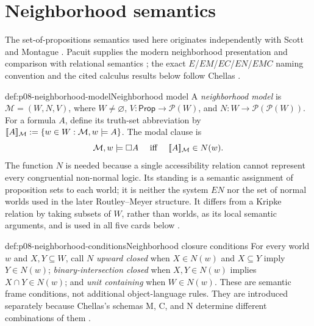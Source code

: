 \section{Neighborhood semantics}

The set-of-propositions semantics used here originates independently with
Scott and Montague \cite{Scott1970,Montague1970}.  Pacuit supplies the modern
neighborhood presentation and comparison with relational semantics
\cite{Pacuit2017}; the exact \(E\)/\(EM\)/\(EC\)/\(EN\)/\(EMC\) naming
convention and the cited
calculus results below follow Chellas \cite{Chellas1980}.

\begin{hbdefinition}{def:p08-neighborhood-model}{Neighborhood model}
A \emph{neighborhood model} is
\(\mathcal M=(W,N,V)\), where \(W\ne\varnothing\),
\(V:\mathsf{Prop}\to\mathcal P(W)\), and
\(N:W\to\mathcal P(\mathcal P(W))\).  For a formula \(A\), define
its truth-set abbreviation by
\(\lbrack\!\lbrack A\rbrack\!\rbrack_{\mathcal M}
\mathrel{:=}\{w\in W:\mathcal M,w\models A\}\).  The modal clause is
\[
 \mathcal M,w\models\Box A
 \quad\text{ iff }\quad
 \lbrack\!\lbrack A\rbrack\!\rbrack_{\mathcal M}\in N(w).
\]
The function \(N\) is needed because a single accessibility relation
cannot represent every congruential non-normal logic.  Its standing is a
semantic assignment of proposition sets to each world; it is neither the
system \(EN\) nor the set of normal worlds used in the later
Routley--Meyer structure.  It differs from a Kripke
relation by taking subsets of \(W\), rather than worlds, as its local semantic
arguments, and is used in all five cards below
\cite{Scott1970,Montague1970,Chellas1980,Pacuit2017}.
\end{hbdefinition}

\begin{hbdefinition}{def:p08-neighborhood-conditions}{Neighborhood closure conditions}
For every world \(w\) and \(X,Y\subseteq W\), call \(N\)
\emph{upward closed} when
\(X\in N(w)\) and \(X\subseteq Y\) imply
\(Y\in N(w)\); \emph{binary-intersection closed} when
\(X,Y\in N(w)\) implies
\(X\cap Y\in N(w)\); and \emph{unit containing} when
\(W\in N(w)\).  These are semantic frame conditions, not additional
object-language rules.  They are introduced separately because Chellas's
schemas M, C, and N determine different combinations of them
\cite{Chellas1980,Pacuit2017}.
\end{hbdefinition}

